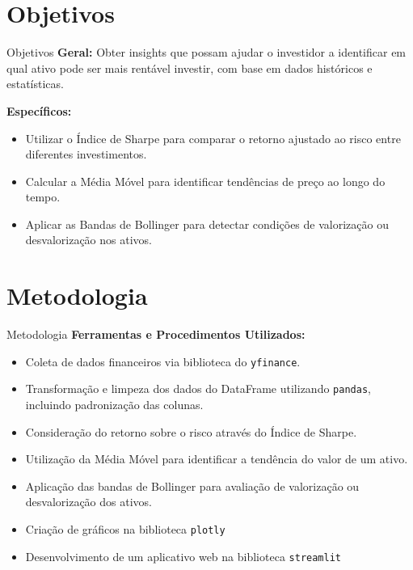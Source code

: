 \documentclass[aspectratio=169]{beamer}
\begin{document}
\section{Objetivos}
\begin{frame}{Objetivos}
  \textbf{Geral:}  
  Obter insights que possam ajudar o investidor a identificar em qual ativo pode ser mais rentável investir, com base em dados históricos e estatísticas.

  \vspace{0.5cm}
  \textbf{Específicos:}
  \begin{itemize}
    \item Utilizar o Índice de Sharpe para comparar o retorno ajustado ao risco entre diferentes investimentos.
    \item Calcular a Média Móvel para identificar tendências de preço ao longo do tempo.
    \item Aplicar as Bandas de Bollinger para detectar condições de valorização ou desvalorização nos ativos.
  \end{itemize}
\end{frame}

\section{Metodologia}
\begin{frame}{Metodologia}
  \textbf{Ferramentas e Procedimentos Utilizados:}
  \begin{itemize}
    \item Coleta de dados financeiros via biblioteca do \texttt{yfinance}.
    \item Transformação e limpeza dos dados do DataFrame utilizando \texttt{pandas}, incluindo padronização das colunas.
    \item Consideração do retorno sobre o risco através do Índice de Sharpe.
    \item Utilização da Média Móvel para identificar a tendência do valor de um ativo.
    \item Aplicação das bandas de Bollinger para avaliação de valorização ou desvalorização dos ativos.
    \item  Criação de gráficos na biblioteca \texttt{plotly}
    \item Desenvolvimento de um aplicativo web na biblioteca \texttt{streamlit}
  \end{itemize}
\end{frame}
\end{document}
